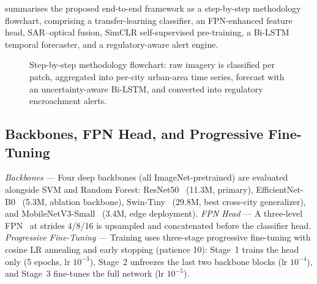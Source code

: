 \documentclass[conference]{IEEEtran}
\begin{document}
 summarises the proposed end-to-end framework as a step-by-step methodology flowchart, comprising a transfer-learning classifier, an FPN-enhanced feature head, SAR--optical fusion, SimCLR self-supervised pre-training, a Bi-LSTM temporal forecaster, and a regulatory-aware alert engine.

\begin{figure}[t]
\centering
{}
\caption{Step-by-step methodology flowchart: raw imagery is classified per patch, aggregated into per-city urban-area time series, forecast with an uncertainty-aware Bi-LSTM, and converted into regulatory encroachment alerts.}
\label{fig:flowchart}
\end{figure}

\subsection{Backbones, FPN Head, and Progressive Fine-Tuning}

\emph{Backbones} --- Four deep backbones (all ImageNet-pretrained) are evaluated alongside SVM and Random Forest: ResNet50~\cite{he2016} (11.3M, primary), EfficientNet-B0~\cite{tan2019} (5.3M, ablation backbone), Swin-Tiny~\cite{liu2021} (29.8M, best cross-city generalizer), and MobileNetV3-Small~\cite{howard2019} (3.4M, edge deployment).
\emph{FPN Head} --- A three-level FPN~\cite{lin2017fpn} at strides 4/8/16 is upsampled and concatenated before the classifier head.
\emph{Progressive Fine-Tuning} --- Training uses three-stage progressive fine-tuning with cosine LR annealing and early stopping (patience 10): Stage~1 trains the head only (5 epochs, lr $10^{-3}$), Stage~2 unfreezes the last two backbone blocks (lr $10^{-4}$), and Stage~3 fine-tunes the full network (lr $10^{-5}$).
\end{document}
